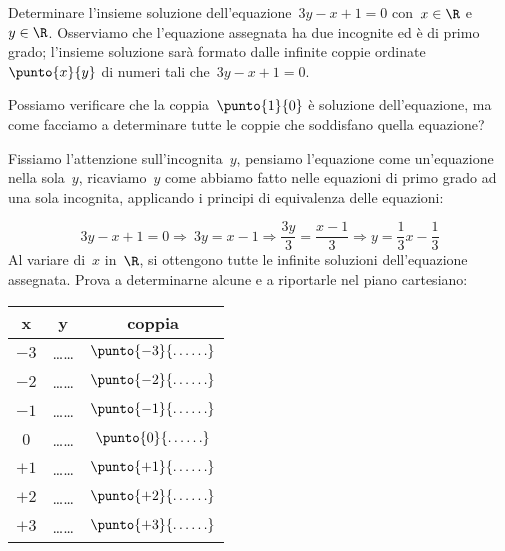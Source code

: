  \begin{esempio}
Determinare l'insieme soluzione dell'equazione~\(3y-x+1=0\) con~\(x\in\R\) 
e~\(y\in\R\).
Osserviamo che l'equazione assegnata ha due incognite ed
è di primo grado; l'insieme soluzione sarà formato
dalle infinite coppie ordinate~\(\punto{x}{y}\) di numeri tali 
che~\(3y-x+1=0\).

Possiamo verificare che la coppia~\(\punto{1}{0}\) è soluzione
dell'equazione, ma come facciamo a determinare tutte le
coppie che soddisfano quella equazione?

Fissiamo l'attenzione sull'incognita~\(y\),
pensiamo l'equazione come un'equazione
nella sola~\(y\), ricaviamo~\(y\) come abbiamo fatto nelle equazioni di primo
grado ad una sola incognita, applicando i principi di equivalenza delle
equazioni:

\begin{equation*}
3y-x+1=0\Rightarrow~3y=x-1\Rightarrow\frac{3y}{3}=\frac{x-1}{3}\Rightarrow 
y=\frac{1}{3}x-\frac{1}{3}
\end{equation*}
Al variare di~\(x\) in~\(\R\), si ottengono tutte le infinite
soluzioni dell'equazione assegnata.
Prova a determinarne alcune e a riportarle nel piano cartesiano:

\begin{minipage}{.48\textwidth}
\begin{center}
 \begin{tabular}{ccc}
\toprule
x & y & coppia\\
\midrule
\(-3\) & \ldots\ldots & \(\punto{-3}{\ldots\ldots}\)\\
\(-2\) & \ldots\ldots & \(\punto{-2}{\ldots\ldots}\)\\
\(-1\) & \ldots\ldots & \(\punto{-1}{\ldots\ldots}\)\\
\(0\) & \ldots\ldots & \(\punto{0}{\ldots\ldots}\)\\
\(+1\) & \ldots\ldots & \(\punto{+1}{\ldots\ldots}\)\\
\(+2\) & \ldots\ldots & \(\punto{+2}{\ldots\ldots}\)\\
\(+3\) & \ldots\ldots & \(\punto{+3}{\ldots\ldots}\)\\
\bottomrule
\end{tabular}
\end{center}
\end{minipage}
\hfill
\begin{minipage}{.48\textwidth}
%  
\end{minipage}


\end{esempio}
